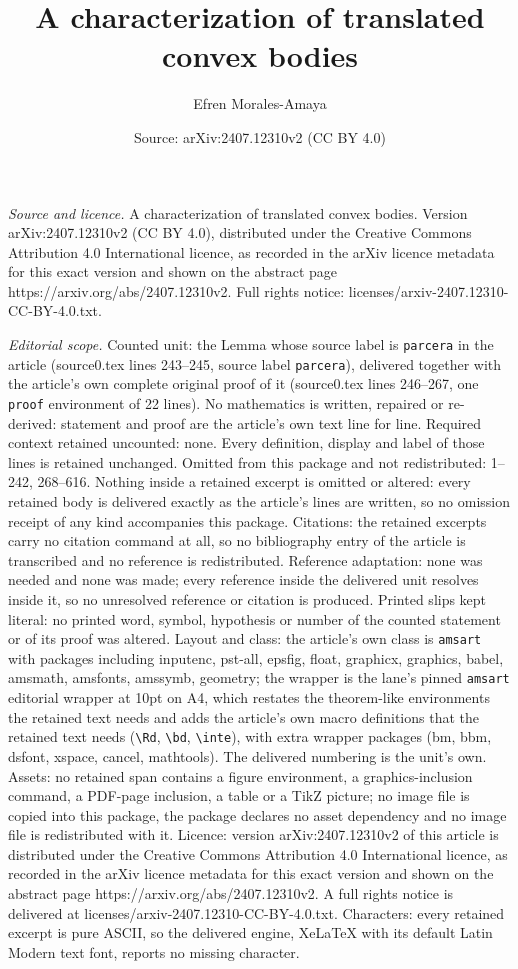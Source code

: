 \documentclass[10pt,a4paper]{amsart}
\title[A characterization of translated convex bodies]{A characterization of translated convex bodies}
\author{Efren Morales-Amaya}
\date{Source: arXiv:2407.12310v2 (CC BY 4.0)}
\begin{document}
\maketitle

\noindent\emph{Source and licence.} A characterization of translated convex bodies. Version arXiv:2407.12310v2 (CC BY 4.0), distributed under the Creative Commons Attribution 4.0 International licence, as recorded in the arXiv licence metadata for this exact version and shown on the abstract page https://arxiv.org/abs/2407.12310v2. Full rights notice: licenses/arxiv-2407.12310-CC-BY-4.0.txt.\par\smallskip

\noindent\textit{Editorial scope.} Counted unit: the Lemma whose source label is \texttt{parcera} in the article (source0.tex lines 243--245, source label \texttt{parcera}), delivered together with the article's own complete original proof of it (source0.tex lines 246--267, one \texttt{proof} environment of 22 lines). No mathematics is written, repaired or re-derived: statement and proof are the article's own text line for line. Required context retained uncounted: none. Every definition, display and label of those lines is retained unchanged. Omitted from this package and not redistributed: 1--242, 268--616. Nothing inside a retained excerpt is omitted or altered: every retained body is delivered exactly as the article's lines are written, so no omission receipt of any kind accompanies this package. Citations: the retained excerpts carry no citation command at all, so no bibliography entry of the article is transcribed and no reference is redistributed. Reference adaptation: none was needed and none was made; every reference inside the delivered unit resolves inside it, so no unresolved reference or citation is produced. Printed slips kept literal: no printed word, symbol, hypothesis or number of the counted statement or of its proof was altered. Layout and class: the article's own class is \texttt{amsart} with packages including inputenc, pst-all, epsfig, float, graphicx, graphics, babel, amsmath, amsfonts, amssymb, geometry; the wrapper is the lane's pinned \texttt{amsart} editorial wrapper at 10pt on A4, which restates the theorem-like environments the retained text needs and adds the article's own macro definitions that the retained text needs (\texttt{\textbackslash Rd}, \texttt{\textbackslash bd}, \texttt{\textbackslash inte}), with extra wrapper packages (bm, bbm, dsfont, xspace, cancel, mathtools). The delivered numbering is the unit's own. Assets: no retained span contains a figure environment, a graphics-inclusion command, a PDF-page inclusion, a table or a TikZ picture; no image file is copied into this package, the package declares no asset dependency and no image file is redistributed with it. Licence: version arXiv:2407.12310v2 of this article is distributed under the Creative Commons Attribution 4.0 International licence, as recorded in the arXiv licence metadata for this exact version and shown on the abstract page https://arxiv.org/abs/2407.12310v2. A full rights notice is delivered at licenses/arxiv-2407.12310-CC-BY-4.0.txt. Characters: every retained excerpt is pure ASCII, so the delivered engine, XeLaTeX with its default Latin Modern text font, reports no missing character.
\end{document}
